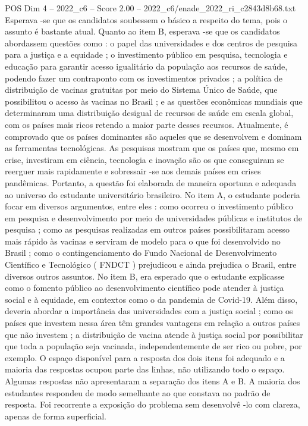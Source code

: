 \begin{textsample}{POS Dim 4 – 2022\_c6 – Score 2.00 – 2022\_c6/enade\_2022\_ri\_c2843d8b68.txt}
Esperava -se que os candidatos soubessem o básico a respeito do tema, pois o assunto é bastante atual.
Quanto ao item B, esperava -se que os candidatos abordassem questões como : o papel das universidades e dos centros de pesquisa para a justiça e a equidade ; o investimento público em pesquisa, tecnologia e educação para garantir acesso igualitário da população aos recursos de saúde, podendo fazer um contraponto com os investimentos privados ; a política de distribuição de vacinas gratuitas por meio do Sistema Único de Saúde, que possibilitou o acesso às vacinas no Brasil ; e as questões econômicas mundiais que determinaram uma distribuição desigual de recursos de saúde em escala global, com os países mais ricos retendo a maior parte desses recursos.
Atualmente, é comprovado que os países dominantes são aqueles que se desenvolvem e dominam as ferramentas tecnológicas.
As pesquisas mostram que os países que, mesmo em crise, investiram em ciência, tecnologia e inovação são os que conseguiram se reerguer mais rapidamente e sobressair -se aos demais países em crises pandêmicas.
Portanto, a questão foi elaborada de maneira oportuna e adequada ao universo do estudante universitário brasileiro.
No item A, o estudante poderia focar em diversos argumentos, entre eles : como ocorreu o investimento público em pesquisa e desenvolvimento por meio de universidades públicas e institutos de pesquisa ; como as pesquisas realizadas em outros países possibilitaram acesso mais rápido às vacinas e serviram de modelo para o que foi desenvolvido no Brasil ; como o contingenciamento do Fundo Nacional de Desenvolvimento Científico e Tecnológico ( FNDCT ) prejudicou e ainda prejudica o Brasil, entre diversos outros assuntos.
No item B, era esperado que o estudante explicasse como o fomento público ao desenvolvimento científico pode atender à justiça social e à equidade, em contextos como o da pandemia de Covid-19.
Além disso, deveria abordar a importância das universidades com a justiça social ; como os países que investem nessa área têm grandes vantagens em relação a outros países que não investem ; a distribuição de vacina atende à justiça social por possibilitar que toda a população seja vacinada, independentemente de ser rico ou pobre, por exemplo.
O espaço disponível para a resposta dos dois itens foi adequado e a maioria das respostas ocupou parte das linhas, não utilizando todo o espaço.
Algumas respostas não apresentaram a separação dos itens A e B.
A maioria dos estudantes respondeu de modo semelhante ao que constava no padrão de resposta.
Foi recorrente a exposição do problema sem desenvolvê -lo com clareza, apenas de forma superficial.

\end{textsample}

